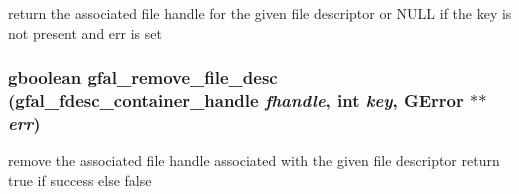 return the associated file handle for the given file descriptor or NULL if the key is not present and err is set 
\subsubsection{\setlength{\rightskip}{0pt plus 5cm}gboolean gfal\_\-remove\_\-file\_\-desc (gfal\_\-fdesc\_\-container\_\-handle {\em fhandle}, int {\em key}, GError $\ast$$\ast$ {\em err})}\label{gfal__common__filedescriptor_8c_4b10e1d3a5ffde849302fffdba207835}


remove the associated file handle associated with the given file descriptor return true if success else false 